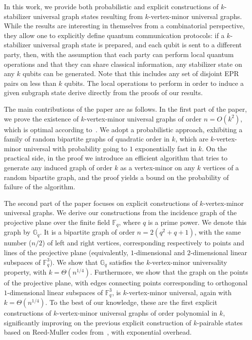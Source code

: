 \documentclass[a4paper,UKenglish,cleveref, autoref, thm-restate]{arxiv}
\begin{document}
In this work, we provide both probabilistic and explicit constructions of $k$-stabilizer universal graph states resulting from $k$-vertex-minor universal graphs. While the results are interesting in themselves from a combinatorial perspective, they allow one to explicitly define quantum communication protocols: if a $k$-stabilizer universal graph state is prepared, and each qubit is sent to a different party, then, with the assumption that each party can perform local quantum operations and that they can share classical information, any stabilizer state on any $k$ qubits can be generated. Note that this includes any set of disjoint EPR pairs on less than $k$ qubits. The local operations to perform in order to induce a given subgraph state derive directly  from the proofs of our results. 

The main contributions of the paper are as follows. 
In the first part of the paper, we prove the existence of $k$-vertex-minor universal graphs of order $n=O(k^2)$, which is optimal according to~\cite{claudet2023small}. We adopt a probabilistic approach, exhibiting a family of random bipartite graphs of quadratic order in $k$, which are $k$-vertex-minor universal with  probability going to $1$ exponentially fast in $k$. On the practical side, in the proof we introduce an efficient algorithm that tries to generate any induced graph of order $k$ as a vertex-minor on any $k$ vertices of a random bipartite graph, and the proof yields a bound on the probability of failure of the algorithm.

The second part of the paper focuses on explicit constructions of $k$-vertex-minor universal graphs. We derive our constructions from the incidence graph of the projective plane over the finite field  $\mathbb{F}_q$, where $q$ is a prime power. We denote this graph by $\mathbb{G}_q$. It is a bipartite graph of order $n=2(q^2+q+1)$, with the same number ($n/2$) of left and right vertices, corresponding respectively to points and lines of the projective plane (equivalently,  $1$-dimensional and $2$-dimensional linear subspaces of $\mathbb{F}_q^3$).  We show  that $\mathbb{G}_q$ satisfies the $k$-vertex-minor universality property, with $k = \Theta(n^{1/4})$. Furthermore, we show that the  graph on the points of the projective plane, with edges connecting points corresponding to orthogonal $1$-dimensional linear subspaces of $\mathbb{F}_q^3$, is $k$-vertex-minor universal, again with $k = \Theta(n^{1/4})$. To the best of our knowledge, these are the first explicit constructions of $k$-vertex-minor universal graphs of order polynomial in $k$, significantly improving on the previous explicit construction of $k$-pairable states based on Reed-Muller codes from~\cite{bravyi2022generating}, with exponential overhead.
\end{document}
